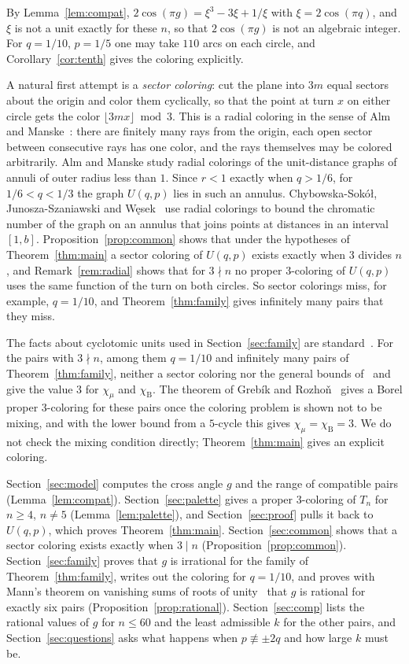 \documentclass[11pt]{amsart}
\theoremstyle{remark}
\numberwithin{equation}{section}
\newcommand{\chiB}{\chi_{\mathrm B}}
\newcommand{\chiM}{\chi_{\mu}}
\begin{document}
By Lemma~\ref{lem:compat}, $2\cos(\pi g)=\xi^3-3\xi+1/\xi$ with
$\xi=2\cos(\pi q)$, and $\xi$ is not a unit exactly for these $n$, so
that $2\cos(\pi g)$ is not an algebraic integer. For $q=1/10$, $p=1/5$
one may take $110$ arcs on each circle, and Corollary~\ref{cor:tenth}
gives the coloring explicitly.

A natural first attempt is a \emph{sector coloring}: cut the plane into
$3m$ equal sectors about the origin and color them cyclically, so that
the point at turn $x$ on either circle gets the color
$\lfloor3mx\rfloor\bmod3$. This is a radial coloring in the sense of
Alm and Manske~\cite{AM14}: there are finitely many rays from the
origin, each open sector between consecutive rays has one color, and
the rays themselves may be colored arbitrarily. Alm and Manske study radial colorings of the
unit-distance graphs of annuli of outer radius less than $1$. Since
$r<1$ exactly when $q>1/6$, for $1/6<q<1/3$ the graph $U(q,p)$ lies in
such an annulus. Chybowska-Sok\'o\l, Junosza-Szaniawski and
W\k{e}sek~\cite[Proposition~4.1]{CJW22} use radial colorings to bound
the chromatic number of the graph on an annulus that joins points at
distances in an interval $[1,b]$. Proposition~\ref{prop:common} shows
that under the hypotheses of Theorem~\ref{thm:main} a sector coloring
of $U(q,p)$ exists exactly when $3$ divides $n$, and
Remark~\ref{rem:radial} shows that for $3\nmid n$ no proper
$3$-coloring of $U(q,p)$ uses the same function of the turn on both
circles. So sector
colorings miss, for example, $q=1/10$, and Theorem~\ref{thm:family}
gives infinitely many pairs that they miss.

The facts about cyclotomic units used in Section~\ref{sec:family} are
standard~\cite[Chapter~2]{Was97}. For the pairs with $3\nmid n$, among
them $q=1/10$ and infinitely many pairs of Theorem~\ref{thm:family},
neither a sector coloring
nor the general bounds of~\cite{CMT16} and~\cite{Wei20} give the value
$3$ for $\chiM$ and $\chiB$. The theorem of Greb\'ik and
Rozho\v{n}~\cite[Theorem~5.9]{GR21} gives a Borel proper $3$-coloring
for these pairs once the coloring problem is shown not to be mixing, and
with the lower bound from a $5$-cycle this gives $\chiM=\chiB=3$. We do
not check the mixing condition directly; Theorem~\ref{thm:main} gives
an explicit coloring.

Section~\ref{sec:model} computes the cross angle $g$ and the range of
compatible pairs (Lemma~\ref{lem:compat}). Section~\ref{sec:palette}
gives a proper $3$-coloring of $T_n$ for $n\ge4$, $n\ne5$
(Lemma~\ref{lem:palette}), and Section~\ref{sec:proof} pulls it back to
$U(q,p)$, which proves Theorem~\ref{thm:main}.
Section~\ref{sec:common} shows that a sector coloring exists exactly
when $3\mid n$ (Proposition~\ref{prop:common}).
Section~\ref{sec:family} proves that $g$ is irrational for the family
of Theorem~\ref{thm:family}, writes out the coloring for $q=1/10$, and
proves with Mann's theorem on vanishing sums of roots of
unity~\cite{Man65} that $g$ is rational for exactly six pairs
(Proposition~\ref{prop:rational}).
Section~\ref{sec:comp} lists the rational values of $g$ for $n\le60$
and the least admissible $k$ for the other pairs, and
Section~\ref{sec:questions} asks what happens when $p\not\equiv\pm2q$
and how large $k$ must be.
\end{document}
